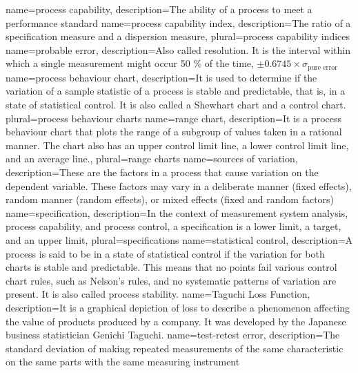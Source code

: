 {
    name={process capability},
    description={The ability of a process to meet a performance standard}
}
{
    name={process capability index},
    description={The ratio of a specification measure and a dispersion measure},
    plural={process capability indices}
}
{
    name={probable error},
    description={Also called resolution. It is the interval within which a single measurement might occur 50 \% of the time, $\pm 0.6745 \times \sigma_\text{pure error}$}
}
{
    name={process behaviour chart},
    description={It is used to determine if the variation of a sample statistic of a process is stable and predictable, that is, in a state of statistical control. It is also called a Shewhart chart and a control chart.}
    plural={process behaviour charts}
}
{
    name={range chart},
    description={It is a process behaviour chart that plots the range of a subgroup of values taken in a rational manner. The chart also has an upper control limit line, a lower control limit line, and an average line.},
    plural={range charts}
}
{
    name={sources of variation},
    description={These are the factors in a process that cause variation on the dependent variable. These factors may vary in a deliberate manner (fixed effects), random manner (random effects), or mixed effects (fixed and random factors)}
}
{
    name={specification},
    description={In the context of measurement system analysis, process capability, and process control, a specification is a lower limit, a target, and an upper limit},
    plural={specifications}
}
{
    name={statistical control},
    description={A process is said to be in a state of statistical control if the variation for both charts is stable and predictable. This means that no points fail various control chart rules, such as Nelson's rules, and no systematic patterns of variation are present. It is also called process stability.}
}
{
    name={Taguchi Loss Function},
    description={It is a graphical depiction of loss to describe a phenomenon affecting the value of products produced by a company. It was developed by the Japanese business statistician Genichi Taguchi.}
}
{
    name={test-retest error},
    description={The standard deviation of making repeated measurements of the same characteristic on the same parts with the same measuring instrument}
}
